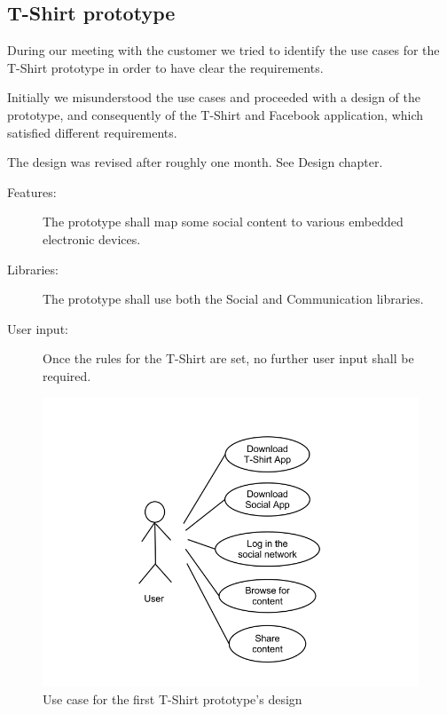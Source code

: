 	\newpage

	\subsection{T-Shirt prototype}

	During our meeting with the customer we tried to identify the
	use cases for the T-Shirt prototype in order to have clear the requirements.

	Initially we misunderstood the use cases and proceeded with a design of
	the prototype, and consequently of the T-Shirt and Facebook application,
	which satisfied different requirements.

	The design was revised after roughly one month. See Design chapter.
	
	\begin{description}
		\item[Features:] The prototype shall map some social content
		to various embedded electronic devices.
		\item[Libraries:] The prototype shall use both the Social and
		Communication libraries.
		\item[User input:] Once the rules for the T-Shirt are set,
		no further user input shall be required.
	\end{description}

	\begin{figure}[h!]
	\centering \includegraphics[scale=0.50]{img/req-usecase1.png}
	\caption{Use case for the first T-Shirt prototype's design}
	\label{fig:req-usecase1}
	\end{figure}

